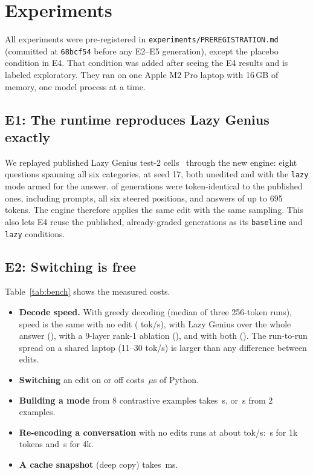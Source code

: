 \section{Experiments}

All experiments were pre-registered in \texttt{experiments/PREREGISTRATION.md} (committed at \texttt{68bcf54} before any E2--E5 generation), except the placebo condition in E4. That condition was added after seeing the E4 results and is labeled exploratory. They ran on one Apple M2 Pro laptop with 16\,GB of memory, one model process at a time.

\subsection{E1: The runtime reproduces Lazy Genius exactly}
\label{sec:e1}
We replayed published Lazy Genius test-2 cells~\cite{lazygenius} through the new engine: eight questions spanning all six categories, at seed 17, both unedited and with the \texttt{lazy} mode armed for the answer. \FidelityIdentical{} of \FidelityCells{} generations were token-identical to the published ones, including prompts, all six steered positions, and answers of up to 695 tokens. The engine therefore applies the same edit with the same sampling. This also lets E4 reuse the published, already-graded generations as its \texttt{baseline} and \texttt{lazy} conditions.

\subsection{E2: Switching is free}
\label{sec:e2}
Table~\ref{tab:bench} shows the measured costs.
\begin{itemize}
\item \textbf{Decode speed.} With greedy decoding (median of three 256-token runs), speed is the same with no edit (\DecodeNone{} tok/s), with Lazy Genius over the whole answer (\DecodeWhole), with a 9-layer rank-1 ablation (\DecodeAblate), and with both (\DecodeBoth). The run-to-run spread on a shared laptop (11--30 tok/s) is larger than any difference between edits.
\item \textbf{Switching} an edit on or off costs \SwitchUs\,$\mu$s of Python.
\item \textbf{Building a mode} from 8 contrastive examples takes \BuildEight\,s, or \BuildTwo\,s from 2 examples.
\item \textbf{Re-encoding a conversation} with no edits runs at about \ReprefillTps{} tok/s: \ReprefillB\,s for 1k tokens and \ReprefillD\,s for 4k.
\item \textbf{A cache snapshot} (deep copy) takes \SnapshotMs\,ms.
\end{itemize}

